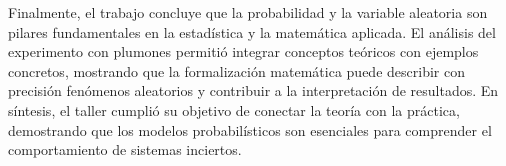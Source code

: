 \documentclass[10pt,letterpaper]{article}
\begin{document}
Finalmente, el trabajo concluye que la probabilidad y la variable aleatoria son pilares fundamentales en la estadística y la matemática aplicada. El análisis del experimento con plumones permitió integrar conceptos teóricos con ejemplos concretos, mostrando que la formalización matemática puede describir con precisión fenómenos aleatorios y contribuir a la interpretación de resultados. En síntesis, el taller cumplió su objetivo de conectar la teoría con la práctica, demostrando que los modelos probabilísticos son esenciales para comprender el comportamiento de sistemas inciertos.

\clearpage 

\printbibliography[heading=bibintoc]
\end{document}
